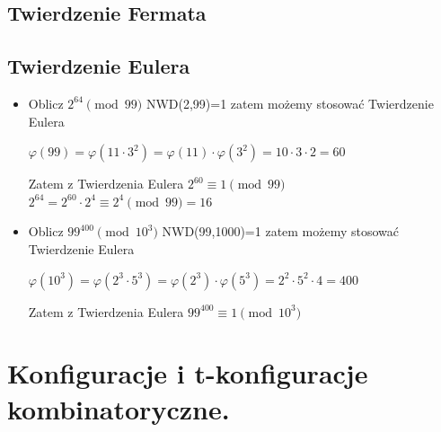 \documentclass[12pt]{article}
\begin{document}
    \subsection{Twierdzenie Fermata}
    
    \subsection{Twierdzenie Eulera}
    \begin{itemize}
        \item Oblicz $2^{64} \pmod {99}$\newline
        NWD(2,99)=1 zatem możemy stosować Twierdzenie Eulera
        
        $\varphi(99) = \varphi(11\cdot 3^2) = \varphi(11) \cdot \varphi(3^2) = 10 \cdot 3 \cdot 2 = 60$
        
        Zatem z Twierdzenia Eulera\newline
        $2^{60} \equiv 1 \pmod {99}$\newline
        $2^{64} = 2^{60} \cdot 2^4 \equiv 2^4 \pmod {99} = 16$
        
        \item Oblicz $99^{400}\pmod {10^3}$\newline
        NWD(99,1000)=1 zatem możemy stosować Twierdzenie Eulera
        
        $\varphi(10^3) = \varphi(2^3 \cdot 5^3) = \varphi(2^3) \cdot \varphi(5^3) = 2^2 \cdot 5^2 \cdot 4 = 400$
        
        Zatem z Twierdzenia Eulera\newline
        $99^{400} \equiv 1 \pmod {10^3}$
        
    \end{itemize}
    \newpage

    \section{Konfiguracje i t-konfiguracje kombinatoryczne.}
\end{document}
